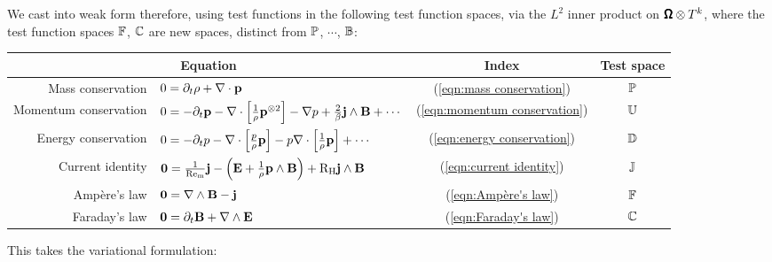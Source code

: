     We cast into weak form therefore, using test functions in the following test function spaces, via the $L^{2}$ inner product on $\pmb{\mathsf{\Omega}}\otimes T^{k}$, where the test function spaces $\mathbb{F}$, $\mathbb{C}$ are new spaces, distinct from $\mathbb{P}$, $\cdots$, $\mathbb{B}$:
    \begin{center}\begin{tabular}{ r l c | c }
        \multicolumn{2}{c}{Equation}  &  Index  &  Test space  \\
        \hline\hline
        Mass conservation  &  $0  =  \partial_{t}\rho + \nabla\cdot\mathbf{p}$  &  (\ref{eqn:mass conservation})  &  $\mathbb{P}$  \\
        Momentum conservation  &  $0  =  - \partial_{t}\mathbf{p} - \nabla\cdot\left[\frac{1}{\rho}\mathbf{p}^{\otimes 2}\right] - \nabla p + \frac{2}{\beta}\mathbf{j}\wedge\mathbf{B} + \cdots$  &  (\ref{eqn:momentum conservation})  &  $\mathbb{U}$  \\
        Energy conservation  &  $0  =  - \partial_{t}p - \nabla\cdot\left[\frac{p}{\rho}\mathbf{p}\right] - p\nabla\cdot\left[\frac{1}{\rho}\mathbf{p}\right] + \cdots$  &  (\ref{eqn:energy conservation})  &  $\mathbb{D}$  \\
        \hline
        Current identity  &  $\mathbf{0}  =  \frac{1}{\mathrm{Re}_{\mathrm{m}}}\mathbf{j} - \left(\mathbf{E} + \frac{1}{\rho}\mathbf{p}\wedge\mathbf{B}\right) + \mathrm{R}_{\mathrm{H}}\mathbf{j}\wedge\mathbf{B}$  &  (\ref{eqn:current identity})  &  $\mathbb{J}$  \\
        \hline
        Ampère's law  &  $\mathbf{0}  =  \nabla\wedge\mathbf{B} - \mathbf{j}$  &  (\ref{eqn:Ampère's law})  &  $\mathbb{F}$  \\
        Faraday's law  &  $\mathbf{0}  =  \partial_{t}\mathbf{B} + \nabla\wedge\mathbf{E}$  &  (\ref{eqn:Faraday's law})  &  $\mathbb{C}$  \\
    \end{tabular}\end{center}
    This takes the variational formulation:
